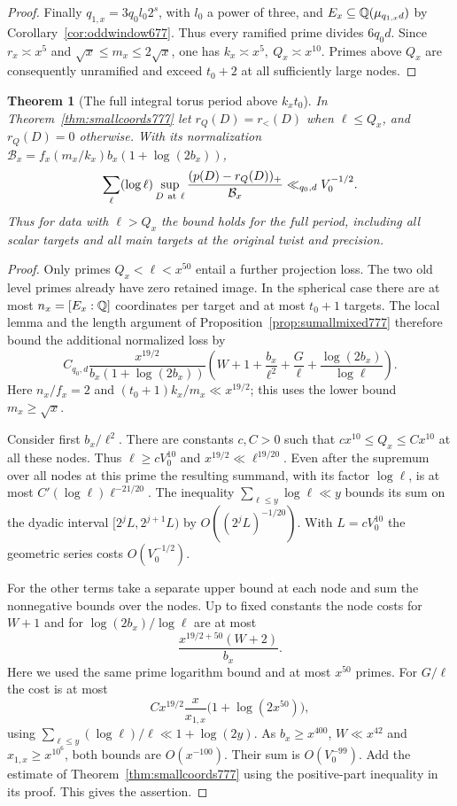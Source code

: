 \documentclass[a4paper,11pt]{article}
\newtheorem{theorem}[proposition]{Theorem}
\theoremstyle{definition}
\theoremstyle{remark}
\numberwithin{equation}{section}
\begin{document}
\begin{proof}
Finally \(q_{1,x}=3q_0 l_0 2^s\), with \(l_0\) a power of
three, and \(E_x\subseteq\mathbb Q(\mu_{q_{1,x}d})\) by
Corollary~\ref{cor:oddwindow677}. Thus every ramified
prime divides \(6q_0d\). Since \(r_x\asymp x^5\) and
\(\sqrt{x}\le m_x\le2\sqrt{x}\), one has
\(k_x\asymp x^5,\ Q_x\asymp x^{10}\). Primes above
\(Q_x\) are consequently unramified and exceed \(t_0+2\)
at all sufficiently large nodes.
\end{proof}

\begin{theorem}[The full integral torus period above \(k_x t_0\)]
\leavevmode\label{thm:rankcutoff778}
In Theorem~\ref{thm:smallcoords777} let \(r_Q(D)=r_{<}(D)\)
when \(\ell\le Q_x\), and \(r_Q(D)=0\) otherwise. With its
normalization \(\mathcal B_x=f_x(m_x/k_x)b_x(1+\log(2b_x))\),
\[
 \sum_\ell(\log\ell)\sup_{D\ {\rm at}\ \ell}
      \frac{(p(D)-r_Q(D))_+}{\mathcal B_x}
       \ll_{q_0,d} V_0^{-1/2}.
\]
Thus for data with \(\ell>Q_x\) the bound holds for the
full period, including all scalar targets and all main
targets at the original twist and precision.
\end{theorem}
\begin{proof}
Only primes \(Q_x<\ell<x^{50}\) entail a further
projection loss. The two old level primes already have
zero retained image. In the spherical case there are
at most \(n_x=[E_x:\mathbb Q]\) coordinates per target and
at most \(t_0+1\) targets. The local lemma and the
length argument of Proposition~\ref{prop:sumallmixed777}
therefore bound the additional normalized loss by
\[
 C_{q_0,d}\frac{x^{19/2}}{b_x(1+\log(2b_x))}
 \left(W+1+\frac{b_x}{\ell^2}+\frac{G}{\ell}
                       +\frac{\log(2b_x)}{\log\ell}\right).
\]
Here \(n_x/f_x=2\) and
\((t_0+1)k_x/m_x\ll x^{19/2}\); this uses the lower
bound \(m_x\ge\sqrt{x}\).

Consider first \(b_x/\ell^2\). There are constants
\(c,C>0\) such that \(c x^{10}\le Q_x\le Cx^{10}\)
at all these nodes. Thus \(\ell\ge cV_0^{10}\) and
\(x^{19/2}\ll\ell^{19/20}\). Even after the supremum
over all nodes at this prime the resulting summand,
with its factor \(\log\ell\), is at most
\(C'(\log\ell)\ell^{-21/20}\).
The inequality \(\sum_{\ell\le y}\log\ell\ll y\) bounds
its sum on the dyadic interval \([2^j L,2^{j+1}L)\)
by \(O((2^j L)^{-1/20})\). With \(L=cV_0^{10}\) the
geometric series costs \(O(V_0^{-1/2})\).

For the other terms take a separate upper bound at
each node and sum the nonnegative bounds over the
nodes. Up to fixed constants the node costs for \(W+1\)
and for \(\log(2b_x)/\log\ell\) are at most
\[
             \frac{x^{19/2+50}(W+2)}{b_x}.
\]
Here we used the same prime logarithm bound and at most
\(x^{50}\) primes. For \(G/\ell\) the cost is at most
\[
      C x^{19/2}\frac{x}{x_{1,x}}\big(1+\log(2x^{50})\big),
\]
using \(\sum_{\ell\le y}(\log\ell)/\ell\ll1+\log(2y)\).
As \(b_x\ge x^{400}\), \(W\ll x^{42}\) and
\(x_{1,x}\ge x^{10^6}\), both bounds are \(O(x^{-100})\).
Their sum is \(O(V_0^{-99})\). Add the estimate of
Theorem~\ref{thm:smallcoords777} using the positive-part
inequality in its proof. This gives the assertion.
\end{proof}
\clearpage
\end{document}
